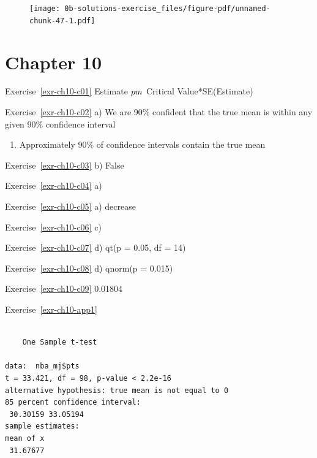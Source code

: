 \documentclass[
  letterpaper,
  DIV=11,
  numbers=noendperiod]{scrreprt}
\newenvironment{Shaded}{\begin{snugshade}}{\end{snugshade}}
\newcommand{\AttributeTok}[1]{\textcolor[rgb]{0.40,0.45,0.13}{#1}}
\newcommand{\FloatTok}[1]{\textcolor[rgb]{0.68,0.00,0.00}{#1}}
\newcommand{\FunctionTok}[1]{\textcolor[rgb]{0.28,0.35,0.67}{#1}}
\newcommand{\NormalTok}[1]{\textcolor[rgb]{0.00,0.23,0.31}{#1}}
\newcommand{\OtherTok}[1]{\textcolor[rgb]{0.00,0.23,0.31}{#1}}
\newcommand{\SpecialCharTok}[1]{\textcolor[rgb]{0.37,0.37,0.37}{#1}}
\newcommand{\StringTok}[1]{\textcolor[rgb]{0.13,0.47,0.30}{#1}}
\providecommand{\tightlist}{%
  \setlength{\itemsep}{0pt}\setlength{\parskip}{0pt}}\usepackage{longtable,booktabs,array}
\theoremstyle{definition}
\theoremstyle{remark}
\begin{document}
\begin{figure}[H]

{\centering \texttt{[image: 0b-solutions-exercise\_files/figure-pdf/unnamed-chunk-47-1.pdf]}

}

\end{figure}

\hypertarget{sec-ex10-sol}{%
\section{Chapter 10}\label{sec-ex10-sol}}

Exercise~\ref{exr-ch10-c01} Estimate \(\\pm\) Critical
Value*SE(Estimate)

Exercise~\ref{exr-ch10-c02} a) We are 90\% confident that the true mean
is within any given 90\% confidence interval

\begin{enumerate}
\def\labelenumi{\alph{enumi})}
\setcounter{enumi}{3}
\tightlist
\item
  Approximately 90\% of confidence intervals contain the true mean
\end{enumerate}

Exercise~\ref{exr-ch10-c03} b) False

Exercise~\ref{exr-ch10-c04} a)

Exercise~\ref{exr-ch10-c05} a) decrease

Exercise~\ref{exr-ch10-c06} c)

Exercise~\ref{exr-ch10-c07} d) qt(p = 0.05, df = 14)

Exercise~\ref{exr-ch10-c08} d) qnorm(p = 0.015)

Exercise~\ref{exr-ch10-c09} 0.01804

Exercise~\ref{exr-ch10-app1}

\begin{Shaded}
\end{Shaded}

\begin{verbatim}

    One Sample t-test

data:  nba_mj$pts
t = 33.421, df = 98, p-value < 2.2e-16
alternative hypothesis: true mean is not equal to 0
85 percent confidence interval:
 30.30159 33.05194
sample estimates:
mean of x 
 31.67677 
\end{verbatim}
\end{document}
